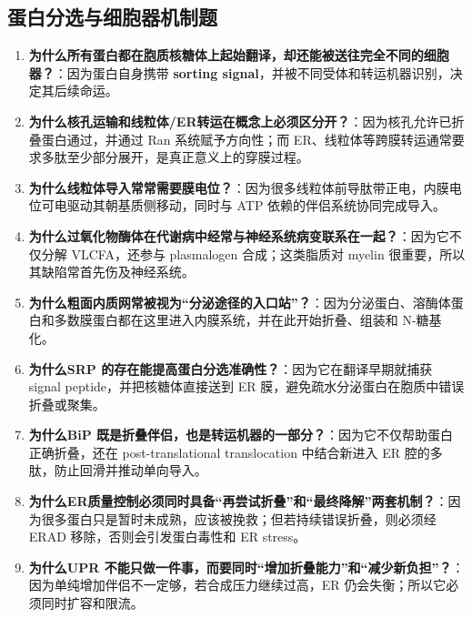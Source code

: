\documentclass[12pt,fontset=none]{ctexart}
\begin{document}
\subsection*{蛋白分选与细胞器机制题}
\begin{enumerate}
\item \textbf{为什么所有蛋白都在胞质核糖体上起始翻译，却还能被送往完全不同的细胞器？}：因为蛋白自身携带 \textbf{sorting signal}，并被不同受体和转运机器识别，决定其后续命运。

\item \textbf{为什么核孔运输和线粒体/ER转运在概念上必须区分开？}：因为核孔允许已折叠蛋白通过，并通过 Ran 系统赋予方向性；而 ER、线粒体等跨膜转运通常要求多肽至少部分展开，是真正意义上的穿膜过程。

\item \textbf{为什么线粒体导入常常需要膜电位？}：因为很多线粒体前导肽带正电，内膜电位可电驱动其朝基质侧移动，同时与 ATP 依赖的伴侣系统协同完成导入。

\item \textbf{为什么过氧化物酶体在代谢病中经常与神经系统病变联系在一起？}：因为它不仅分解 VLCFA，还参与 plasmalogen 合成；这类脂质对 myelin 很重要，所以其缺陷常首先伤及神经系统。

\item \textbf{为什么粗面内质网常被视为“分泌途径的入口站”？}：因为分泌蛋白、溶酶体蛋白和多数膜蛋白都在这里进入内膜系统，并在此开始折叠、组装和 N-糖基化。

\item \textbf{为什么SRP 的存在能提高蛋白分选准确性？}：因为它在翻译早期就捕获 signal peptide，并把核糖体直接送到 ER 膜，避免疏水分泌蛋白在胞质中错误折叠或聚集。

\item \textbf{为什么BiP 既是折叠伴侣，也是转运机器的一部分？}：因为它不仅帮助蛋白正确折叠，还在 post-translational translocation 中结合新进入 ER 腔的多肽，防止回滑并推动单向导入。

\item \textbf{为什么ER质量控制必须同时具备“再尝试折叠”和“最终降解”两套机制？}：因为很多蛋白只是暂时未成熟，应该被挽救；但若持续错误折叠，则必须经 ERAD 移除，否则会引发蛋白毒性和 ER stress。

\item \textbf{为什么UPR 不能只做一件事，而要同时“增加折叠能力”和“减少新负担”？}：因为单纯增加伴侣不一定够，若合成压力继续过高，ER 仍会失衡；所以它必须同时扩容和限流。
\end{enumerate}

\end{document}
